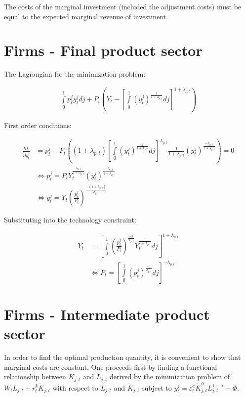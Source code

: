 \documentclass{pracamgr}
\numberwithin{equation}{section}
\begin{document}
The costs of the marginal investment (included the adjustment costs) must be equal to the expected marginal revenue of investment.

\section*{Firms - Final product sector}

The Lagrangian for the minimization problem:

\begin{align}
\int\limits_{0}^{1} p_{t}^{j} y_{t}^{j}dj + P_{t} \left( Y_{t} - \left[ \int\limits_{0}^{1} \left(y_{t}^{j} \right)^\frac{1}{1+\lambda_{p,t}} dj \right]^{1+\lambda_{p,t}} \right)
\end{align}

First order conditions:

\begin{align}
\frac{\partial L}{\partial y_{t}^{j}} &= p_{t}^{j} - P_{t} \left( \left( 1+\lambda_{p,t} \right) \left[ \int\limits_{0}^{1} \left(y_{t}^{j} \right)^\frac{1}{1+\lambda_{p,t}} dj \right]^{\lambda_{p,t}} \frac{1}{1+\lambda_{p,t}} \left( y_{t}^{j} \right)^{ \frac{-\lambda_{p,t}}{1+\lambda_{p,t}}} \right) = 0 \nonumber \\
&  \iff p_{t}^{j} = P_{t}  Y_{t}^{ \frac{\lambda_{p,t}}{1+\lambda_{p,t}}} \left( y_{t}^{j} \right)^{ \frac{-\lambda_{p,t}}{1+\lambda_{p,t}}} \nonumber \\
& \iff y_{t}^{j} = Y_{t} \left( \frac{p_{t}^{j}}{P_{t}} \right)^{ \frac{-(1+\lambda_{p,t})}{\lambda_{p,t}}} 
\end{align}

Substituting into the technology constraint:

\begin{align}
Y_{t} &=  \left[ \int\limits_{0}^{1} \left( \frac{ p_{t}^{j}}{P_{t}} \right)^{\frac{-1}{\lambda_{p,t}}} Y_{t}^\frac{1}{1+\lambda_{p,t}} dj \right]^{1+\lambda_{p,t}} \nonumber \\
& \iff P_{t} = \left[ \int\limits_{0}^{1} \left( p_{t}^{j} \right)^{\frac{-1}{\lambda_{p,t}}} dj \right]^{-\lambda_{p,t}}
\end{align}


\section*{Firms - Intermediate product sector}

In order to find the optimal production quantity, it is convenient to show that marginal costs are constant. One proceeds first by finding a functional relationship between $\widetilde{K}_{j,t}$ and $L_{j,t}$ derived by the minimization problem of $W_{t}L_{j,t} + r_{t}^{k} \widetilde{K}_{j,t}$ with respect to $L_{j,t}$ and $\widetilde{K}_{j,t}$ subject to $y_{t}^{j} = \varepsilon_{t}^{a} \widetilde{K}_{j,t}^{\alpha} L_{j,t}^{1-\alpha} - \Phi$.
\end{document}
